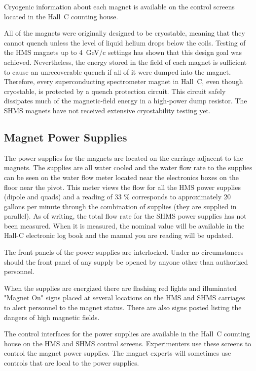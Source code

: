 Cryogenic information about each magnet is available on the control
screens located in the Hall~C counting house.

All of the magnets were originally designed to be cryostable, meaning that they
cannot quench unless the level of liquid helium drops below the coils. Testing of
the HMS magnets up to 4~GeV/c settings has shown that this design goal
was achieved. Nevertheless, the energy stored in the field of each magnet is sufficient 
to cause an unrecoverable quench if all of it were dumped into the magnet. 
Therefore, every superconducting spectrometer magnet in Hall~C, even though 
cryostable, is protected by a quench protection circuit. This circuit safely dissipates
much of the magnetic-field energy in a high-power dump resistor. The SHMS
magnets have not received extensive cryostability testing yet. 

\subsection {Magnet Power Supplies}

The power supplies for the magnets are located on the carriage
adjacent to the magnets. The supplies are all water cooled and
the water flow rate to the supplies can be seen on the water flow
meter located near the electronics boxes on the floor near the pivot.
This meter views the flow for all the HMS power supplies
(dipole and quads) and a reading of 33 $\%$ corresponds to approximately
20 gallons per minute through the combination of supplies (they are supplied
in parallel).
As of writing, the total flow rate for the SHMS power supplies has not been 
measured. When it is measured, the nominal value will be available in the Hall-C electronic log book
and the manual you are reading will be updated. 

The front panels of the power supplies are interlocked. Under
no circumstances should the front panel of any supply be opened by anyone other
than authorized personnel.

When the supplies are energized there are flashing red lights  and 
illuminated "Magnet On" signs placed at
several locations on the HMS and SHMS carriages to alert personnel to the magnet
status. There are also signs posted listing the dangers of high magnetic
fields.

The control interfaces for the power supplies are available in the 
Hall~C counting house on the HMS and SHMS control screens. Experimenters
use these screens to control the magnet power supplies. The magnet experts
will sometimes use controls that are local to the power supplies.

